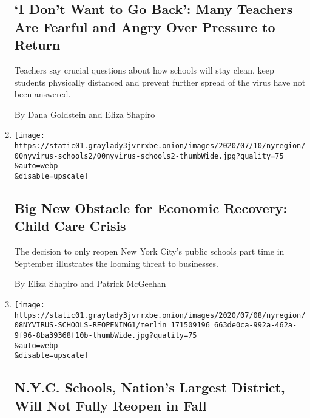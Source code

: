 \begin{enumerate}
  \hypertarget{i-dont-want-to-go-back-many-teachers-are-fearful-and-angry-over-pressure-to-return}{%
  \subsection{`I Don't Want to Go Back': Many Teachers Are Fearful and
  Angry Over Pressure to
  Return}\label{i-dont-want-to-go-back-many-teachers-are-fearful-and-angry-over-pressure-to-return}}

  Teachers say crucial questions about how schools will stay clean, keep
  students physically distanced and prevent further spread of the virus
  have not been answered.

  By Dana Goldstein and Eliza Shapiro
\item
  \href{/2020/07/10/nyregion/nyc-school-daycare-reopening.html}{}

  \texttt{[image: https://static01.graylady3jvrrxbe.onion/images/2020/07/10/nyregion/00nyvirus-schools2/00nyvirus-schools2-thumbWide.jpg?quality=75\\\&auto=webp\\\&disable=upscale]}

  \hypertarget{big-new-obstacle-for-economic-recovery-child-care-crisis}{%
  \subsection{Big New Obstacle for Economic Recovery: Child Care
  Crisis}\label{big-new-obstacle-for-economic-recovery-child-care-crisis}}

  The decision to only reopen New York City's public schools part time
  in September illustrates the looming threat to businesses.

  By Eliza Shapiro and Patrick McGeehan
\item
  \href{/2020/07/08/nyregion/nyc-schools-reopening-plan.html}{}

  \texttt{[image: https://static01.graylady3jvrrxbe.onion/images/2020/07/08/nyregion/08NYVIRUS-SCHOOLS-REOPENING1/merlin\_171509196\_663de0ca-992a-462a-9f96-8ba39368f10b-thumbWide.jpg?quality=75\\\&auto=webp\\\&disable=upscale]}

  \hypertarget{nyc-schools-nations-largest-district-will-not-fully-reopen-in-fall}{%
  \subsection{N.Y.C. Schools, Nation's Largest District, Will Not Fully
  Reopen in
  Fall}\label{nyc-schools-nations-largest-district-will-not-fully-reopen-in-fall}}


\end{enumerate}
